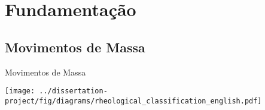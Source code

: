 \section{Fundamentação}

\subsection{Movimentos de Massa}

\begin{frame}{Movimentos de Massa}
    \begin{minipage}[c]{0.70\textwidth}
        \centering
        \texttt{[image: ../dissertation-project/fig/diagrams/rheological\_classification\_english.pdf]}
    \end{minipage}
    \hfill    
    \begin{minipage}[c]{0.28\textwidth}
    \end{minipage}
\end{frame}

